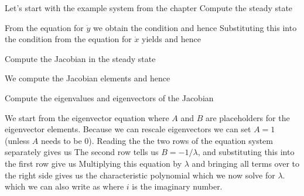 Let's start with the example system from the chapter
\subquestion 
Compute the steady state

\solution
From the equation for $\dot{y}$ we obtain the condition 
and hence 
Substituting this into the condition from the equation for $\dot{x}$ yields 
and hence 

\subquestion 
Compute the Jacobian in the steady state

\solution
We compute the Jacobian elements 
and hence 

\subquestion 
Compute the eigenvalues and eigenvectors of the Jacobian

\solution 
We start from the eigenvector equation 
where $A$ and $B$ are placeholders for the eigenvector elements. Because we can rescale eigenvectors we can set $A=1$ (unless $A$ needs to be 0). Reading the the two rows of the equation system separately gives us 
The second row tells us $B=-1/\lambda$, and substituting this into the first row give us 
Multiplying this equation by $\lambda$ and bringing all terms over to the right side gives us the characteristic polynomial 
which we now solve for $\lambda$. 
which we can also write as 
where $i$ is the imaginary number.

